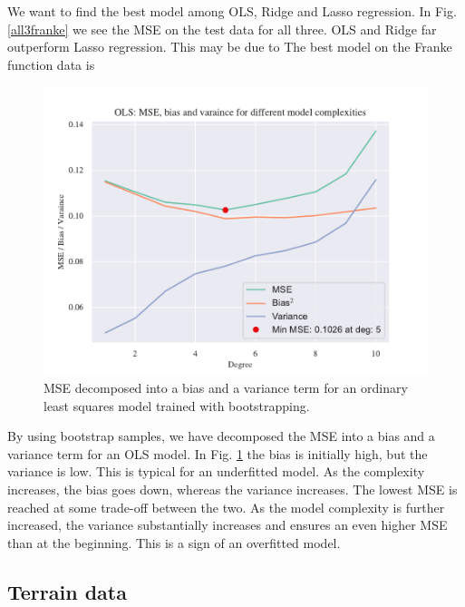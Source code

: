 We want to find the best model among OLS, Ridge and Lasso regression. In Fig. \ref{all3franke} we see the MSE on the test data for all three. OLS and Ridge far outperform Lasso regression. This may be due to  The best model on the Franke function data is 


\begin{figure}
    \centering
    \includegraphics[width=1\linewidth]{project_1_alt/figures/figures_in_report/bias_var_Franke_Noise_bootstrap.pdf}
    \caption{MSE decomposed into a bias and a variance term for an ordinary least squares model trained with bootstrapping.
}
    \label{bias_var_trade}
\end{figure}

By using bootstrap samples, we have decomposed the MSE into a bias and a variance term for an OLS model. 
In Fig. \ref{bias_var_trade} the bias is initially high, but the variance is low. This is typical for an underfitted model. As the complexity increases, the bias goes down, whereas the variance increases. The lowest MSE is reached at some trade-off between the two. As the model complexity is further increased, the variance substantially increases and ensures an even higher MSE than at the beginning. This is a sign of an overfitted model.

\subsection{Terrain data}

